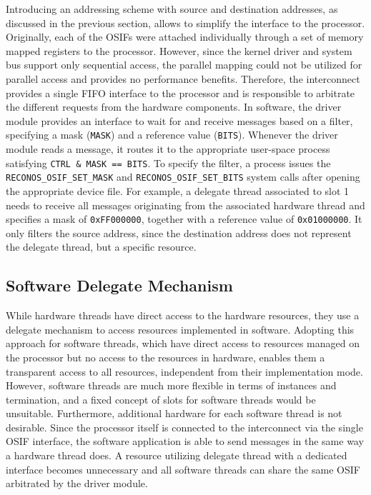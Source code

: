 Introducing an addressing scheme with source and destination addresses, as
discussed in the previous section, allows to simplify the interface to the
processor. Originally, each of the \acp{OSIF} were attached individually
through a set of memory mapped registers to the processor. However, since the
kernel driver and system bus support only sequential access, the parallel
mapping could not be utilized for parallel access and provides no performance
benefits. Therefore, the interconnect provides a single \ac{FIFO} interface to
the processor and is responsible to arbitrate the different requests from the
hardware components. In software, the driver module provides an interface to
wait for and receive messages based on a filter, specifying a mask
(\lstinline{MASK}) and a reference value (\lstinline{BITS}). Whenever the
driver module reads a message, it routes it to the appropriate user-space
process satisfying \lstinline{CTRL & MASK == BITS}. To specify the filter, a
process issues the \lstinline{RECONOS_OSIF_SET_MASK} and
\lstinline{RECONOS_OSIF_SET_BITS} system calls after opening the appropriate
device file. For example, a delegate thread associated to slot 1 needs to
receive all messages originating from the associated hardware thread and
specifies a mask of \lstinline{0xFF000000}, together with a reference value of
\lstinline{0x01000000}. It only filters the source address, since the
destination address does not represent the delegate thread, but a specific
resource.

\subsection{Software Delegate Mechanism}

While hardware threads have direct access to the hardware resources, they use
a delegate mechanism to access resources implemented in software. Adopting
this approach for software threads, which have direct access to resources
managed on the processor but no access to the resources in hardware, enables
them a transparent access to all resources, independent from their
implementation mode. However, software threads are much more flexible in terms
of instances and termination, and a fixed concept of slots for software
threads would be unsuitable. Furthermore, additional hardware for each
software thread is not desirable. Since the processor itself is connected to
the interconnect via the single \ac{OSIF} interface, the software application
is able to send messages in the same way a hardware thread does. A resource
utilizing delegate thread with a dedicated interface becomes unnecessary and
all software threads can share the same \ac{OSIF} arbitrated by the driver
module.

